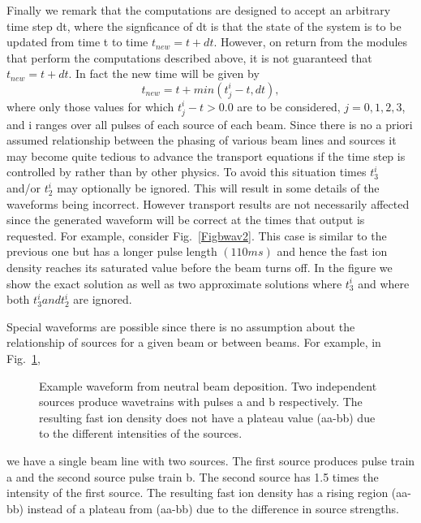 Finally we remark that the computations are designed to accept an arbitrary time
step dt, where the signficance of dt is that the state of the system is to be
updated from time t to time $t_{new} = t+dt $. However, on return from the
modules that perform the computations described above, it is not guaranteed that
$t_{new} =  t+dt$. In fact the new time will be given by
\begin{equation}
 t_{new} = t + min(t_j^i -t ,dt)
 \label{eq:wav10},
\end{equation}
where only those values for which $t_j^i -t >  0.0 $ are to be considered, 
$j=0,1,2,3 $, and i ranges over all pulses of each source of each beam. Since
there is no a priori assumed relationship between the phasing of various beam
lines and sources it may become quite tedious to advance the transport equations
if the time step is controlled by  rather than by other physics.
To avoid this situation times $t_3^i $ and/or $ t_2^i $ may optionally be
ignored. This will result in some details of the waveforms being incorrect.
However transport results are not necessarily affected since the generated
waveform will be correct at the times that output is requested. For example,
consider Fig.~\ref{Figbwav2}.  This case is similar to the previous one but has
a longer pulse length $(110 ms)$ and hence the fast ion density reaches its
saturated value before the beam turns off. In the figure we show the exact
solution as well as two approximate solutions where $t_3^i $ and where both
$t_3^i and t_2^i$ are ignored.

Special waveforms are possible since there is no assumption about the 
relationship of sources for a  given beam or between beams. For example, in
Fig.~\ref{Figbwav3},
\begin{figure}[hbt] %
 \centering
 \mbox{}
 \caption{Example waveform from neutral beam deposition.
 Two independent sources produce wavetrains with pulses a
 and b respectively. The resulting fast ion density does
 not have a plateau value (aa-bb) due to the different
 intensities of the sources.}
 \label{Figbwav3}
\end{figure}
we have a single beam line with two sources. The first source  produces pulse
train a and the second source pulse train b. The second source has 1.5 times the
intensity of the first source. The resulting fast ion density has a rising
region (aa-bb) instead of a plateau from (aa-bb) due to the difference in source
strengths.


